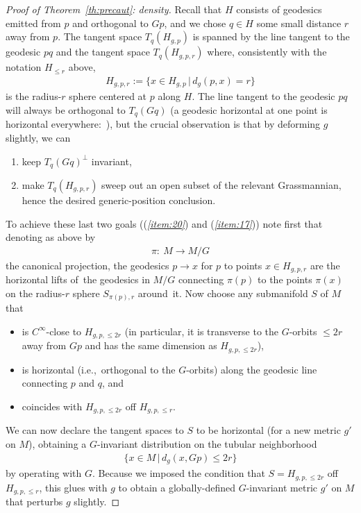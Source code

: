\documentclass[10pt,a4paper]{amsart}
\numberwithin{equation}{section}
\begin{document}
\begin{proof}[Proof of Theorem~\ref{th:precaut}: density]
 Recall that $H$ consists of geodesics emitted from $p$ and orthogonal to $Gp$, and we chose $q\in H$ some small distance $r$ away from $p$. The tangent space $T_q(H_{g,p})$ is spanned by the line tangent to the geodesic $pq$ and the tangent space $T_q(H_{g,p,r})$ where, consistently with the notation $H_{\le r}$ above,
 \begin{gather*}
 H_{g,p,r}:=\{x\in H_{g,p}\,|\, d_g(p,x)=r\}
 \end{gather*}
 is the radius-$r$ sphere centered at $p$ along $H$. The line tangent to the geodesic $pq$ will always be orthogonal to $T_q(Gq)$ (a geodesic horizontal at one point is horizontal everywhere:~\cite[Lem\-ma~9.44]{bes}), but the crucial observation is that by deforming $g$ slightly, we can
 \begin{enumerate}[$(a)$]\itemsep=0pt
 \item\label{item:20} keep $T_q(Gq)^{\perp}$ invariant,
 \item\label{item:17} make $T_q(H_{g,p,r})$ sweep out an open subset of the relevant Grassmannian, hence the desired generic-position conclusion.
 \end{enumerate}

 To achieve these last two goals (({\it \ref{item:20}}) and ({\it \ref{item:17}})) note first that denoting as above by
 \begin{gather*}
 \pi\colon\ M\to M/G
 \end{gather*}
 the canonical projection, the geodesics $p\to x$ for $p$ to points $x\in H_{g,p,r}$ are the horizontal lifts of~the geodesics in $M/G$ connecting $\pi(p)$ to the points $\pi(x)$ on the radius-$r$ sphere $S_{\pi(p),r}$ around~it. Now choose any submanifold $S$ of $M$ that
 \begin{itemize}\itemsep=0pt
 \item is $C^{\infty}$-close to $H_{g,p,\le 2r}$ (in particular, it is transverse to the $G$-orbits $\le 2r$ away from $Gp$ and has the same dimension as $H_{g,p,\le 2r}$),
 \item is horizontal (i.e.,~orthogonal to the $G$-orbits) along the geodesic line connecting $p$ and $q$, and
 \item coincides with $H_{g,p,\le 2r}$ off $H_{g,p,\le r}$.
 \end{itemize}
 We can now declare the tangent spaces to $S$ to be horizontal (for a new metric $g'$ on $M$), obtaining a $G$-invariant distribution on the tubular neighborhood
 \begin{gather*}
 \{x\in M\,|\, d_g(x,Gp)\le 2r\}
 \end{gather*}
 by operating with $G$. Because we imposed the condition that $S=H_{g,p,\le 2r}$ off $H_{g,p,\le r}$, this glues with $g$ to obtain a globally-defined $G$-invariant metric $g'$ on $M$ that perturbs $g$ slightly.


\end{proof}
\end{document}
